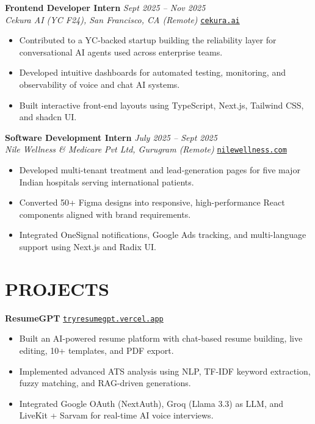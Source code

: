 \documentclass[a4paper,11pt]{article}
\begin{document}
\vspace{2pt}

\textbf{Frontend Developer Intern} \hfill \textit{Sept 2025 -- Nov 2025}\\
\textit{Cekura AI (YC F24), San Francisco, CA (Remote)} \hfill \href{https://www.cekura.ai}{\texttt{cekura.ai}}
\begin{itemize}
    \item Contributed to a YC-backed startup building the reliability layer for conversational AI agents used across enterprise teams.
    \item Developed intuitive dashboards for automated testing, monitoring, and observability of voice and chat AI systems.
    \item Built interactive front-end layouts using TypeScript, Next.js, Tailwind CSS, and shadcn UI.
\end{itemize}

\vspace{2pt}

\textbf{Software Development Intern} \hfill \textit{July 2025 -- Sept 2025}\\
\textit{Nile Wellness \& Medicare Pvt Ltd, Gurugram (Remote)} \hfill \href{https://www.nilewellness.com}{\texttt{nilewellness.com}}
\begin{itemize}
    \item Developed multi-tenant treatment and lead-generation pages for five major Indian hospitals serving international patients.
    \item Converted 50+ Figma designs into responsive, high-performance React components aligned with brand requirements.
    \item Integrated OneSignal notifications, Google Ads tracking, and multi-language support using Next.js and Radix UI.
\end{itemize}

\section*{PROJECTS}

\textbf{ResumeGPT} \hfill \href{https://tryresumegpt.vercel.app}{\texttt{tryresumegpt.vercel.app}}
\begin{itemize}
    \item Built an AI-powered resume platform with chat-based resume building, live editing, 10+ templates, and PDF export.
    \item Implemented advanced ATS analysis using NLP, TF-IDF keyword extraction, fuzzy matching, and RAG-driven generations.
    \item Integrated Google OAuth (NextAuth), Groq (Llama 3.3) as LLM, and LiveKit + Sarvam for real-time AI voice interviews.
\end{itemize}
\end{document}
